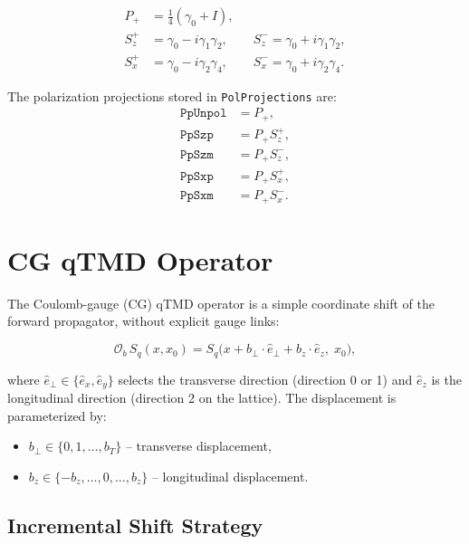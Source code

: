 \documentclass[11pt,a4paper]{article}
\newcommand{\ehat}[1]{\hat{e}_{#1}}
\begin{document}
\begin{align}
  P_+ &= \frac{1}{4}(\gamma_0 + I), \\
  S_z^+ &= \gamma_0 - i\gamma_1\gamma_2, \qquad
  S_z^- = \gamma_0 + i\gamma_1\gamma_2, \\
  S_x^+ &= \gamma_0 - i\gamma_2\gamma_4, \qquad
  S_x^- = \gamma_0 + i\gamma_2\gamma_4.
\end{align}

The polarization projections stored in \texttt{PolProjections} are:
\begin{align}
  \texttt{PpUnpol} &= P_+, \\
  \texttt{PpSzp}   &= P_+ S_z^+, \\
  \texttt{PpSzm}   &= P_+ S_z^-, \\
  \texttt{PpSxp}   &= P_+ S_x^+, \\
  \texttt{PpSxm}   &= P_+ S_x^-.
\end{align}

\section{CG qTMD Operator}
\label{sec:cg_qtmd}

The Coulomb-gauge (CG) qTMD operator is a simple coordinate shift of the forward
propagator, without explicit gauge links:

\begin{equation}
  \mathcal{O}_b\, S_q(x, x_0) =
    S_q\bigl(x + b_\perp \cdot \ehat{\perp} + b_z \cdot \ehat{z},\; x_0\bigr),
  \label{eq:cg_shift}
\end{equation}

where $\ehat{\perp} \in \{\ehat{x}, \ehat{y}\}$ selects the transverse direction
(direction 0 or 1) and $\ehat{z}$ is the longitudinal direction (direction 2 on the
lattice). The displacement is parameterized by:
\begin{itemize}
  \item $b_\perp \in \{0, 1, \dots, b_T\}$ -- transverse displacement,
  \item $b_z \in \{-b_z, \dots, 0, \dots, b_z\}$ -- longitudinal displacement.
\end{itemize}

\subsection{Incremental Shift Strategy}
\end{document}
